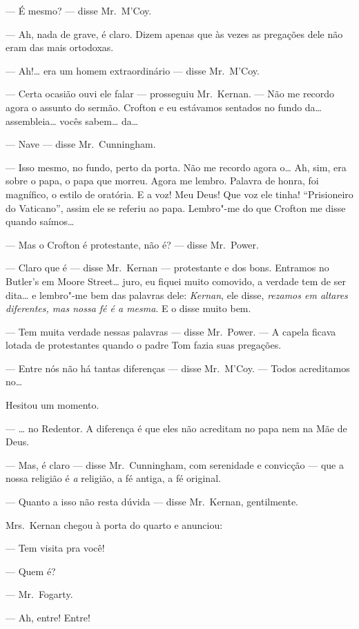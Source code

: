--- É mesmo? --- disse Mr.~M’Coy.

--- Ah, nada de grave, é claro.  Dizem apenas que às vezes as pregações dele
não eram das mais ortodoxas.

--- Ah!\ldots{} era um homem extraordinário --- disse Mr.~M’Coy.

--- Certa ocasião ouvi ele falar --- prosseguiu Mr.~Kernan.  --- Não me recordo
agora o assunto do sermão.  Crofton e eu estávamos sentados no fundo da\ldots{}
assembleia\ldots{} vocês sabem\ldots{} da\ldots{}

--- Nave --- disse Mr.~Cunningham.

--- Isso mesmo, no fundo, perto da porta.  Não me recordo agora o\ldots{} Ah,
sim, era sobre o papa, o papa que morreu.  Agora me lembro.  Palavra de honra,
foi magnífico, o estilo de oratória.  E a voz!  Meu Deus!  Que voz ele tinha!
“Prisioneiro do Vaticano”, assim ele se referiu ao papa.  Lembro"-me do que
Crofton me disse quando saímos\ldots{}

--- Mas o Crofton é protestante, não é? --- disse Mr.~Power.

--- Claro que é --- disse Mr.~Kernan --- protestante e dos bons.  Entramos no
Butler’s em Moore Street\ldots{} juro, eu fiquei muito comovido, a verdade tem
de ser dita\ldots{} e lembro"-me bem das palavras dele: \textit{Kernan}, ele
disse, \textit{rezamos em altares diferentes, mas nossa fé é a mesma}.
E o disse muito bem.

--- Tem muita verdade nessas palavras --- disse Mr.~Power.  --- A capela ficava
lotada de protestantes quando o padre Tom fazia suas pregações.

--- Entre nós não há tantas diferenças --- disse Mr.~M’Coy.  --- Todos
acreditamos no\ldots{}

Hesitou um momento.

--- \ldots{} no Redentor.  A diferença é que eles não acreditam no papa nem na
Mãe de Deus.

--- Mas, é claro --- disse Mr.~Cunningham, com serenidade e convicção --- que a
nossa religião é \textit{a} religião, a fé antiga, a fé original.

--- Quanto a isso não resta dúvida --- disse Mr.~Kernan, gentilmente.

Mrs.~Kernan chegou à porta do quarto e anunciou:

--- Tem visita pra você!

--- Quem é?

--- Mr.~Fogarty.

--- Ah, entre!  Entre!

